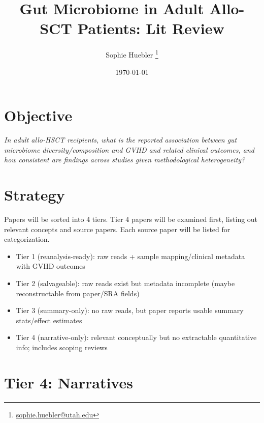 \documentclass[11pt,a4paper]{article}
\begin{document}
%
\title{Gut Microbiome in Adult Allo-SCT Patients: Lit Review}
\author{Sophie Huebler \thanks{\href{mailto:sophie.huebler@utah.edu}{sophie.huebler@utah.edu}}}
\date{\today}
\maketitle
\renewcommand\abstractname{Objective}
\section*{\abstractname}
\textit{In adult allo‑HSCT recipients, what is the reported association between gut microbiome diversity/composition and GVHD and related clinical outcomes, and how consistent are findings across studies given methodological heterogeneity?}
\thispagestyle{empty}
%
%
\tableofcontents
\thispagestyle{empty}
\cleardoublepage
{} 
\newpage
%
%
\section{Strategy}
\label{sec:Strategy}
%
Papers will be sorted into 4 tiers. Tier 4 papers will be examined first, listing out relevant concepts and source papers. Each source paper will be listed for categorization. 
\begin{itemize}
    \item Tier 1 (reanalysis-ready): raw reads + sample mapping/clinical metadata with GVHD outcomes
    \item Tier 2 (salvageable): raw reads exist but metadata incomplete (maybe reconstructable from paper/SRA fields)
    \item Tier 3 (summary-only): no raw reads, but paper reports usable summary stats/effect estimates
    \item Tier 4 (narrative-only): relevant conceptually but no extractable quantitative info; includes scoping reviews
\end{itemize}







%
\section{Tier 4: Narratives}
\label{sec:narratives}
%
\end{document}
